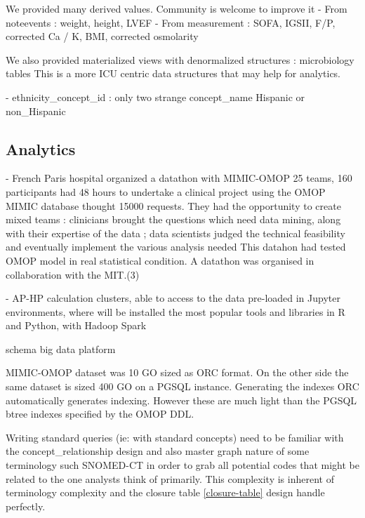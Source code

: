 We provided many derived values. Community is welcome to improve it
- From noteevents : weight, height, LVEF
- From measurement : SOFA, IGSII, F/P, corrected Ca / K, BMI, corrected osmolarity

We also provided materialized views with denormalized structures : microbiology tables
This is a more ICU centric data structures that may help for analytics.


- ethnicity\_concept\_id : only two strange concept\_name Hispanic or non\_Hispanic

\subsection{Analytics}

- French Paris hospital organized a datathon with MIMIC-OMOP
25 teams, 160 participants had 48 hours to undertake a clinical project using the OMOP MIMIC database thought 15000 requests. They had the opportunity to create mixed teams : clinicians brought the questions which need data mining, along with their expertise of the data ; data scientists judged the technical feasibility and eventually implement the various analysis needed
This datahon had tested OMOP model in real statistical condition. A datathon was organised in collaboration with the MIT.(3)

- AP-HP calculation clusters, able to access to the data pre-loaded in Jupyter environments, where will be installed the most popular tools and libraries in R and Python, with Hadoop Spark

schema big data platform

MIMIC-OMOP dataset was 10 GO sized as ORC format. On the other side the same
dataset is sized 400 GO on a PGSQL instance. Generating the indexes
ORC automatically generates indexing. However these are much light than the
PGSQL btree indexes specified by the OMOP DDL.

Writing standard queries (ie: with standard concepts) need to be familiar with
the concept\_relationship design and also master graph nature of some
terminology such SNOMED-CT in order to grab all potential codes that might be
related to the one analysts think of primarily. This complexity is inherent of
terminology complexity and the closure table \ref{closure-table} design handle
perfectly.
